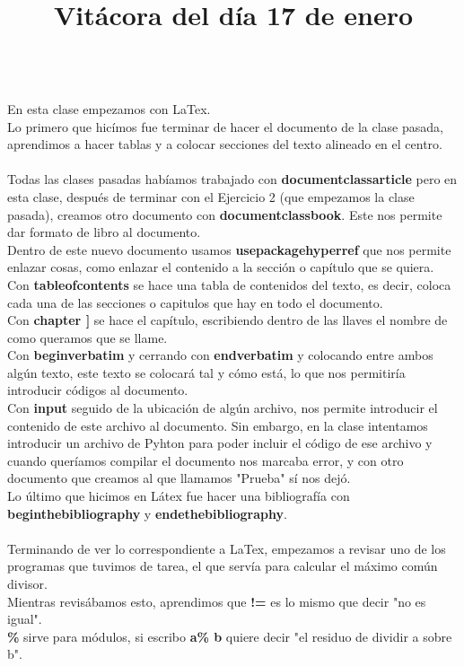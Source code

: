 \documentclass{article}
\begin{document}
	\title{\huge\textbf{Vitácora del día 17 de enero\\}} \\
	En esta clase empezamos con LaTex.\\
	Lo primero que hicímos fue terminar de hacer el documento de la clase pasada, aprendimos a hacer tablas y a colocar secciones del texto alineado en el centro.\\ \\
	Todas las clases pasadas habíamos trabajado con \textbf{documentclass{article}} pero en esta clase, después de terminar con el Ejercicio 2 (que empezamos la clase pasada), creamos otro documento con \textbf{documentclass{book}}. Este nos permite dar formato de libro al documento.\\
	Dentro de este nuevo documento usamos \textbf{usepackage{hyperref}} que nos permite enlazar cosas, como enlazar el contenido a la sección o capítulo que se quiera.\\
	Con \textbf{tableofcontents} se hace una tabla de contenidos del texto, es decir, coloca cada una de las secciones o capitulos que hay en todo el documento. \\
	Con \textbf{chapter{ }]} se hace el capítulo, escribiendo dentro de las llaves el nombre de como queramos que se llame.\\
	Con \textbf{begin{verbatim}} y cerrando con \textbf{end{verbatim}} y colocando entre ambos algún texto, este texto se colocará tal y cómo está, lo que nos permitiría introducir códigos al documento.\\
	Con \textbf{input} seguido de la ubicación de algún archivo, nos permite introducir el contenido de este archivo al documento. Sin embargo, en la clase intentamos introducir un archivo de Pyhton para poder incluir el código de ese archivo y cuando queríamos compilar el documento nos marcaba error, y con otro documento que creamos al que llamamos "Prueba" sí nos dejó. \\ 
	Lo último que hicimos en Látex fue hacer una bibliografía con \textbf{beginthebibliography} y \textbf{endethebibliography}. \\ \\
	Terminando de ver lo correspondiente a LaTex, empezamos a revisar uno de los programas que tuvimos de tarea, el que servía para calcular el máximo común divisor. \\
	Mientras revisábamos esto, aprendimos que \textbf{!=} es lo mismo que decir "no es igual". \\
	\textbf{\%} sirve para módulos, si escribo \textbf{a\% b} quiere decir "el residuo de dividir a sobre b".
	
\end{document}
